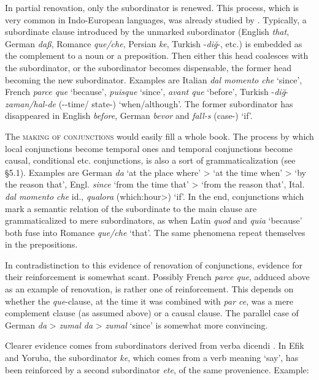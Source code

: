 In partial renovation, only the subordinator is renewed. This process, which is very common in Indo-European languages, was already studied by \citet{Meillet1915}. Typically, a subordinate clause introduced by the unmarked subordinator (English \textit{that}, German \textit{daß}, Romance \textit{que/che}, Persian \textit{ke}, Turkish -\textit{diğ}{}-, etc.) is embedded as the complement to a noun or a preposition. Then either this head coalesces with the subordinator, or the subordinator becomes dispensable, the former head becoming the new subordinator. Examples are Italian \textit{dal momento che} ‘since’, French \textit{parce que} ‘because’, \textit{puisque} ‘since’, \textit{avant que} ‘before’, Turkish -\textit{diğ}-\glposs \textit{zaman/hal-de} (-\nr-\glposs time/ state-\glloc) ‘when/although’. The former subordinator has disappeared in English \textit{before}, German \textit{bevor} and \textit{fall-s} (case-\advr) ‘if’.

The \textsc{making of conjunctions} would easily fill a whole book. The process by which local conjunctions become temporal ones and temporal conjunctions become causal, conditional etc. conjunctions, is also a sort of grammaticalization (see §5.1). Examples are German \textit{da} ‘at the place where’ {\textgreater} ‘at the time when’ {\textgreater} ‘by the reason that’, Engl. \textit{since} ‘from the time that’ {\textgreater} ‘from the reason that’, Ital. \textit{dal momento che} id., \textit{qualora} (which:hour{\textgreater}) ‘if’.\label{page70} In the end, conjunctions which mark a semantic relation of the subordinate to the main clause are grammaticalized to mere subordinators, as when Latin \textit{quod} and \textit{quia} ‘because’ both fuse into Romance \textit{que/che} ‘that’. The same phenomena repeat themselves in the prepositions.

In contradistinction to this evidence of renovation of conjunctions, evidence for their reinforcement is somewhat scant. Possibly French \textit{parce que}, adduced above as an example of renovation, is rather one of reinforcement. This depends on whether the \textit{que}{}-clause, at the time it was combined with \textit{par ce}, was a mere complement clause (as assumed above) or a causal clause. The parallel case of German \textit{da} {\textgreater} \textit{zumal da} {\textgreater} \textit{zumal} ‘since’ is somewhat more convincing.

Clearer evidence comes from subordinators derived from verba dicendi \citep[183]{Lord1976}. In Efik and Yoruba, the subordinator \textit{ke}, which comes from a verb meaning ‘say’, has been reinforced by a second subordinator \textit{ete}, of the same provenience. Example:

